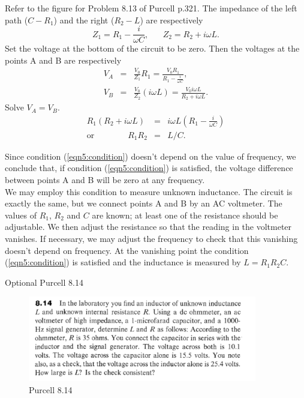 \documentclass[makesolutionspdf]{esg8022pset}
\begin{document}
\begin{solution}
  Refer to the figure for Problem 8.13 of Purcell p.321.  The impedance
  of the left path ($C-R_1$) and the right ($R_2 - L$) are respectively
  \[Z_1=R_1-\frac{i}{\omega C},\;\;\;\;\;\; Z_2=R_2+i\omega L.\]
  Set the voltage at the bottom of the circuit to be zero.  Then the
  voltages at the points A and B are respectively
  \begin{eqnarray}
  V_A &=& \frac{V_0}{Z_1} R_1= \frac{V_0 R_1}{R_1-\frac{i}{\omega
  C}},\nonumber\\
  V_B &=& \frac{V_0}{Z_2} (i\omega L)=\frac{V_0 i\omega L}{R_2+i\omega L}.
  \end{eqnarray}
  Solve $V_A=V_B$.
  \begin{eqnarray}
  R_1(R_2+i\omega L) &=& i\omega L (R_1-\frac{i}{\omega C})\nonumber\\
  \textrm{or}\qquad\qquad R_1 R_2 &=& L/C.\label{eqn5:condition}
  \end{eqnarray}

  Since condition (\ref{eqn5:condition}) doesn't depend on the value of
  frequency, we conclude that, if condition (\ref{eqn5:condition}) is
  satisfied, the voltage difference between points A and B will be zero
  at any frequency.\\

  We may employ this condition to measure unknown inductance.  The
  circuit is exactly the same, but we connect points A and B by an AC
  voltmeter.  The values of $R_1$, $R_2$ and $C$ are known; at least one
  of the resistance should be adjustable.  We then adjust the resistance
  so that the reading in the voltmeter vanishes.  If necessary, we may
  adjust the frequency to check that this vanishing doesn't depend on
  frequency.  At the vanishing point the condition
  (\ref{eqn5:condition}) is satisfied and the inductance is measured by
  $L=R_1 R_2 C$.
\end{solution}


\begin{problem}{Optional Purcell 8.14}
  \begin{figure}[H]
    \centering
    \includegraphics[width = 10cm]{pu814}
    \caption{Purcell 8.14}
  \end{figure}
\end{problem}
\end{document}
